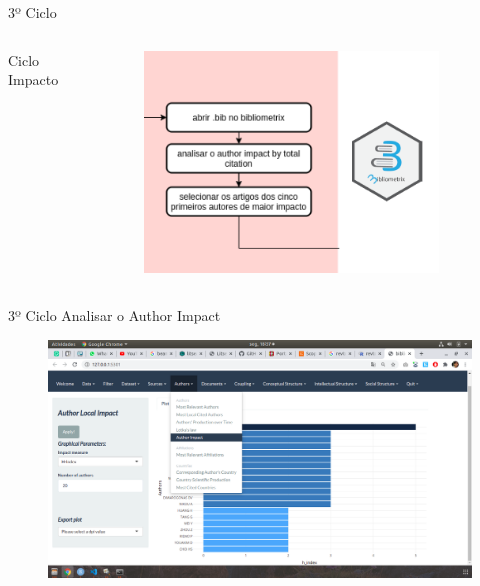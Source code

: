 \begin{frame}{3º Ciclo}
	\begin{columns}
        Ciclo Impacto
		\begin{figure}[hb]
      \includegraphics[width=0.9\textwidth]{figures/ciclo3.png}
		\end{figure}
	\end{columns}
\end{frame}

\begin{frame}{3º Ciclo}
  Analisar o Author Impact
	\begin{figure}[hb]
    \includegraphics[width=1\textwidth]{figures/autorimpact1.png}
  \end{figure}
\end{frame}

